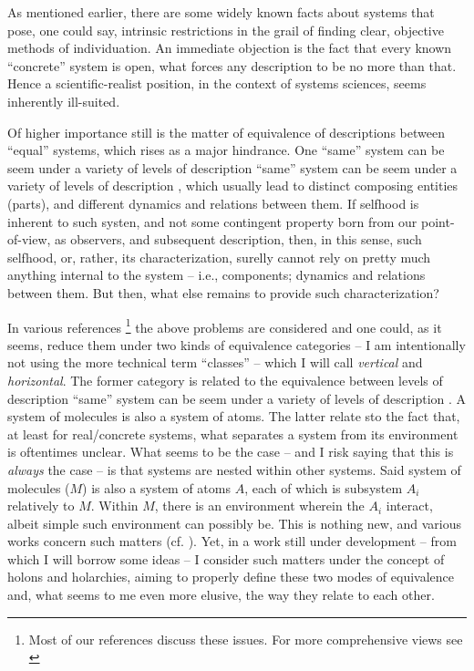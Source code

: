 \documentclass[12pt, a4paper]{article} %
\theoremstyle{definition}
\begin{document}
	As mentioned earlier, there are some widely known facts about systems that pose, one could say, intrinsic restrictions in the grail of finding clear, objective methods of individuation. An immediate objection is the fact that every known ``concrete'' system is open, what forces any description to be no more than that. Hence a scientific-realist position, in the context of systems sciences, seems inherently ill-suited.
	
	Of higher importance still is the matter of equivalence of descriptions between ``equal'' systems, which rises as a major hindrance. One ``same'' system can be seem under a variety of levels of description ``same'' system can be seem under a variety of levels of description \cite{Koestler2013, Koestler1978, Haken2006, Mesarovic1970}, which usually lead to distinct composing entities (parts), and different dynamics and relations between them. If selfhood is inherent to such systen, and not some contingent property born from our point-of-view, as observers, and subsequent description, then, in this sense, such selfhood, or, rather, its characterization, surelly cannot rely on pretty much anything internal to the system -- i.e., components; dynamics and relations between them. But then, what else remains to provide such characterization?
	
	In various references \footnote{Most of our references discuss these issues. For more comprehensive views see \citet{Fieguth2017, Mobus2015, Takahashi2010, Haken2006}} the above problems are considered and one could, as it seems, reduce them under two kinds of equivalence categories -- I am intentionally not using the more technical term ``classes'' -- which I will call \textit{vertical} and \textit{horizontal}. The former category is related to the equivalence between levels of description ``same'' system can be seem under a variety of levels of description \cite{Haken2006, Mesarovic1970}. A system of molecules is also a system of atoms. The latter relate sto the fact that, at least for real/concrete systems, what separates a system from its environment is oftentimes unclear. What seems to be the case -- and I risk saying that this is \textit{always} the case -- is that systems are nested within other systems. Said system of molecules ($M$) is also a system of atoms $A$, each of which is subsystem $A_i$ relatively to $M$. Within $M$, there is an environment wherein the $A_i$ interact, albeit simple such environment can possibly be. This is nothing new, and various works concern such matters (cf. \citet{Walloth2016, Koestler2013}). Yet, in a work still under development -- from which I will borrow some ideas -- I consider such matters under the concept of holons and holarchies, aiming to properly define these two modes of equivalence and, what seems to me even more elusive, the way they relate to each other.
	
\end{document}
